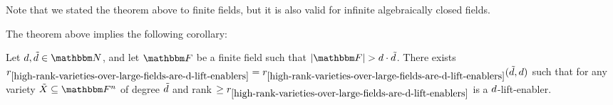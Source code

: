 \begin{note*}
    Note that we stated the theorem above to finite fields, but it is also valid for infinite algebraically closed fields.
\end{note*}
The theorem above implies the following corollary:
\begin{corollary}
    Let $\degree, \varietydeg \in \naturalnumbersset$,
    and let $\basefield$ be a finite field such that $\abs{\basefield} > \degree \cdot \varietydeg$.
    There exists ${{{r}}}_{\ref{high-rank-varieties-over-large-fields-are-d-lift-enablers}} = {{{r}}}_{\ref{high-rank-varieties-over-large-fields-are-d-lift-enablers}}(\tilde{d}, d)$
    such that for any variety $\variety \subseteq \field$ of degree $\tilde{d}$ and rank $\geq {{{r}}}_{\ref{high-rank-varieties-over-large-fields-are-d-lift-enablers}}$
    is a $d$-lift-enabler.
\end{corollary}

